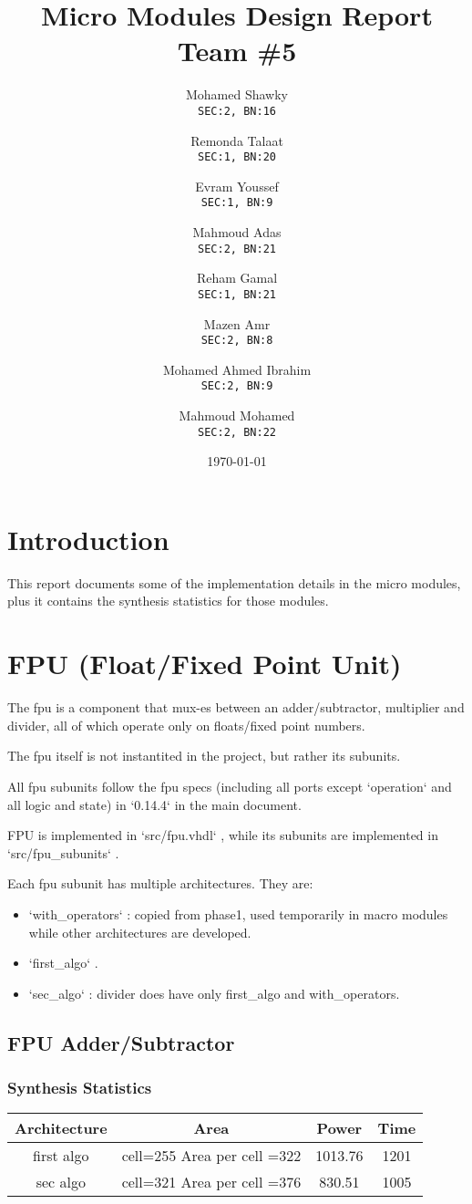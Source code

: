 \documentclass[12pt]{report}
\title{\textbf{Micro Modules Design Report}\\Team \#5}
\author{
  Mohamed Shawky\\
  \small\texttt{SEC:2, BN:16}
  \and
  Remonda Talaat\\
  \small\texttt{SEC:1, BN:20}
  \and
  Evram Youssef\\
  \small\texttt{SEC:1, BN:9}
  \and
  Mahmoud Adas\\
  \small\texttt{SEC:2, BN:21}
  \and
  Reham Gamal\\
  \small\texttt{SEC:1, BN:21}
  \and
  Mazen Amr\\
  \small\texttt{SEC:2, BN:8}
  \and
  Mohamed Ahmed Ibrahim\\
  \small\texttt{SEC:2, BN:9}
  \and
  Mahmoud Mohamed\\
  \small\texttt{SEC:2, BN:22}
}
\date{\today}
\begin{document}
    \thispagestyle{empty}

    \maketitle
    \tableofcontents
    \clearpage


    \section{Introduction}
    This report documents some of the implementation details in the micro modules, plus it contains the synthesis statistics for those modules. 

    \section{FPU (Float/Fixed Point Unit)}
    The fpu is a component that mux-es between an adder/subtractor, multiplier and divider, all of which operate only on floats/fixed point numbers. 

    The fpu itself is not instantited in the project, but rather its subunits. 

    All fpu subunits follow the fpu specs (including all ports except `operation` and all logic and state) in `0.14.4` in the main document. 

    FPU is implemented in `src/fpu.vhdl` , while its subunits are implemented in `src/fpu\_subunits` . 

    Each fpu subunit has multiple architectures. 
    They are: 
    \begin{itemize}
      \item `with\_operators` : copied from phase1, used temporarily in macro modules while other architectures are developed. 
    \item `first\_algo` . 
    \item `sec\_algo` : divider does have only first\_algo and with\_operators. 
    \end{itemize}

    \subsection{FPU Adder/Subtractor}
    \subsubsection{Synthesis Statistics}
    \begin{tabular}{||c|c|c|c||}
      \hline
      Architecture & Area & Power & Time\\\hline\hline
      first algo & cell=255 Area per cell =322 & 1013.76 & 1201\\
      sec algo & cell=321 Area per cell =376 & 830.51 & 1005 \\\hline
  \end{tabular}
\end{document}
